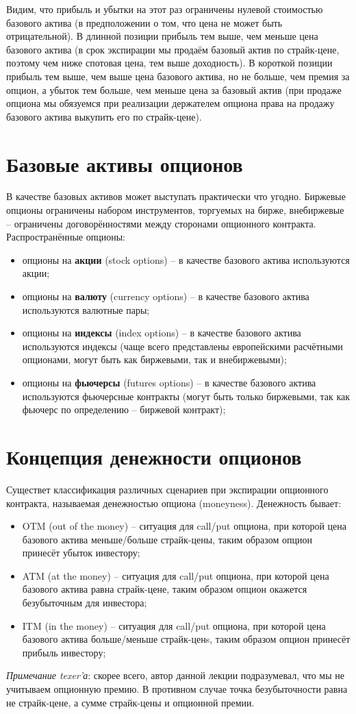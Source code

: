 \documentclass{article}
\begin{document}
Видим, что прибыль и убытки на этот раз ограничены нулевой стоимостью базового актива (в предположении о том, что цена не может быть отрицательной). В длинной позиции прибыль тем выше, чем меньше цена базового актива (в срок экспирации мы продаём базовый актив по страйк-цене, поэтому чем ниже спотовая цена, тем выше доходность). В короткой позиции прибыль тем выше, чем выше цена базового актива, но не больше, чем премия за опцион, а убыток тем больше, чем меньше цена за базовый актив  (при продаже опциона мы обязуемся при реализации держателем опциона права на продажу базового актива выкупить его по страйк-цене).\\
 \section{Базовые активы опционов}
 В качестве базовых активов может выступать практически что угодно. Биржевые опционы ограничены набором инструментов, торгуемых на бирже, внебиржевые -- ограничены договорённостями между сторонами опционного контракта.\\
 Распространённые опционы:
 \begin{itemize}
    \item опционы на \textbf{акции} (stock options) -- в качестве базового актива используются акции; 
    \item опционы на \textbf{валюту} (currency options) -- в качестве базового актива используются валютные пары;
    \item опционы на \textbf{индексы} (index options) -- в качестве базового актива используются индексы (чаще всего представлены европейскими расчётными опционами, могут быть как биржевыми, так и внебиржевыми);
    \item опционы на \textbf{фьючерсы} (futures options) -- в качестве базового актива используются фьючерсные контракты (могут быть только биржевыми, так как фьючерс по определению -- биржевой контракт);
\end{itemize}
\section{Концепция денежности опционов}
Существет классификация различных сценариев при экспирации опционного контракта, называемая денежностью опциона (moneyness). Денежность бывает:
 \begin{itemize}
    \item OTM (out of the money) -- ситуация для call/put опциона, при которой цена базового актива меньше/больше страйк-цены, таким образом опцион принесёт убыток инвестору; 
    \item ATM (at the money) -- ситуация для call/put опциона, при которой цена базового актива равна страйк-цене, таким образом опцион окажется безубыточным для инвестора;
    \item ITM (in the money) -- ситуация для call/put опциона, при которой цена базового актива больше/меньше страйк-ценs, таким образом опцион принесёт прибыль инвестору;
\end{itemize}
\textit{Примечание texer'а}: скорее всего, автор данной лекции подразумевал, что мы не учитываем опционную премию. В противном случае точка безубыточности равна не страйк-цене, а сумме страйк-цены и опционной премии.
\end{document}
